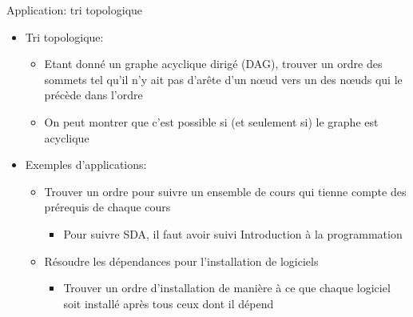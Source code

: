 



\begin{frame}{Application: tri topologique}
\begin{itemize}
\item Tri topologique:
\begin{itemize}
\item Etant donné un \alert{graphe acyclique dirigé} (DAG), trouver un
  ordre des sommets tel qu'il n'y ait pas d'arête d'un n\oe ud vers un
  des n\oe uds qui le précède dans l'ordre
\item On peut montrer que c'est possible si (et seulement si) le
  graphe est acyclique
\end{itemize}

\bigskip

\item Exemples d'applications:
\begin{itemize}
\item Trouver un ordre pour suivre un ensemble de cours qui tienne compte des prérequis de chaque cours
\begin{itemize}
\item Pour suivre SDA, il faut avoir suivi Introduction à la programmation
\end{itemize}
\item Résoudre les dépendances pour l'installation de logiciels
\begin{itemize}
\item Trouver un ordre d'installation de manière à ce que chaque logiciel soit installé après tous ceux dont il dépend
\end{itemize}
\end{itemize}
\end{itemize}

\end{frame}

